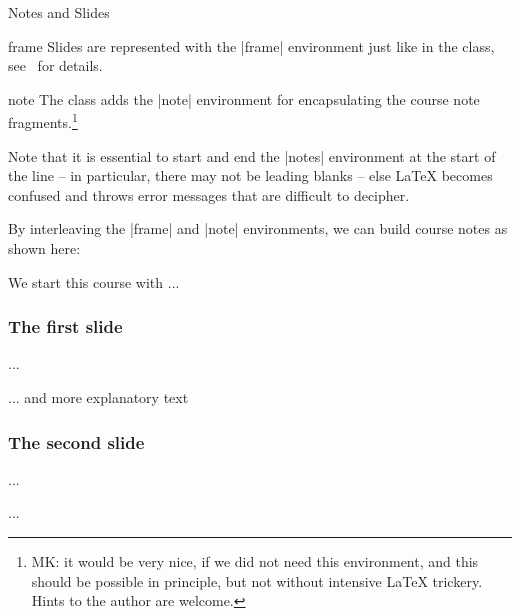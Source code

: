 \begin{sfragment}[id=sec:user:notesslides]{Notes and Slides}

\begin{environment}{frame}
  Slides are represented with the |frame| environment just like in the  class,
  see~\cite{Tantau:ugbc} for details.
\end{environment}

\begin{environment}{note}
  The  class adds the |note| environment for encapsulating the course
  note fragments.\footnote{MK: it would be very nice, if we did not need this environment,
    and this should be possible in principle, but not without intensive LaTeX
    trickery. Hints to the author are welcome.}
\end{environment}
  
\begin{dangerbox}
  Note that it is essential to start and end the |notes| environment at the start of the
  line -- in particular, there may not be leading blanks -- else {\LaTeX} becomes confused
  and throws error messages that are difficult to decipher.
\end{dangerbox}

By interleaving the |frame| and |note| environments, we can build course notes as shown
here:

\begin{latexcode}
\ifnotes\maketitle\else
\frame[noframenumbering]\maketitle\fi

\begin{note}
  We start this course with ...
\end{note}

\begin{frame}
  \frametitle{The first slide}
  ...
\end{frame}
\begin{note}
  ... and more explanatory text
\end{note}

\begin{frame}
  \frametitle{The second slide}
  ...
\end{frame}
...
\end{latexcode}


\end{sfragment}
